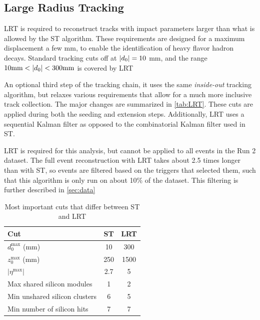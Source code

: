 \subsection{Large Radius Tracking}

\ac{LRT} \cite{lrt} is required to reconstruct tracks with impact parameters larger than what is allowed by the \ac{ST} algorithm. These requirements are designed for a maximum displacement a few mm, to enable the identification of heavy flavor hadron decays. Standard tracking cuts off at $|d_0| = 10$ mm, and the range $ 10 \text{mm} < |d_0| < 300 \text{mm}$ is covered by \ac{LRT}

An optional third step of the tracking chain, it uses the same \emph{inside-out} tracking algorithm, but relaxes various requirements that allow for a much more inclusive track collection. The major changes are summarized in \autoref{tab:LRT}. These cuts are applied during both the seeding and extension steps. Additionally, \ac{LRT} uses a sequential Kalman filter as opposed to the combinatorial Kalman filter used in \ac{ST}.

\ac{LRT} is required for this analysis, but cannot be applied to all events in the Run 2 dataset. The full event reconstruction with \ac{LRT} takes about 2.5 times longer than with \ac{ST}, so events are filtered based on the triggers that selected them, such that this algorithm is only run on about 10\% of the dataset. This filtering is further described in \autoref{sec:data}


\begin{table}
\centering
\begin{tabular}{lcc}
Cut & \ac{ST} & \ac{LRT}  \\
\hline
$d_{0}^{\textrm{max}}$ (mm)   & 10   & 300 \\
$z_{0}^{\textrm{max}}$ (mm)   & 250   & 1500 \\
$ |\eta^{\textrm{max}}|$        & 2.7   & 5 \\
Max shared silicon modules    & 1     & 2 \\
Min unshared silicon clusters   & 6     & 5 \\
Min number of silicon hits   & 7     & 7 \\
\hline
\end{tabular}
\caption{Most important cuts that differ between \ac{ST} and \ac{LRT}}
\label{tab:LRT}
\end{table}

